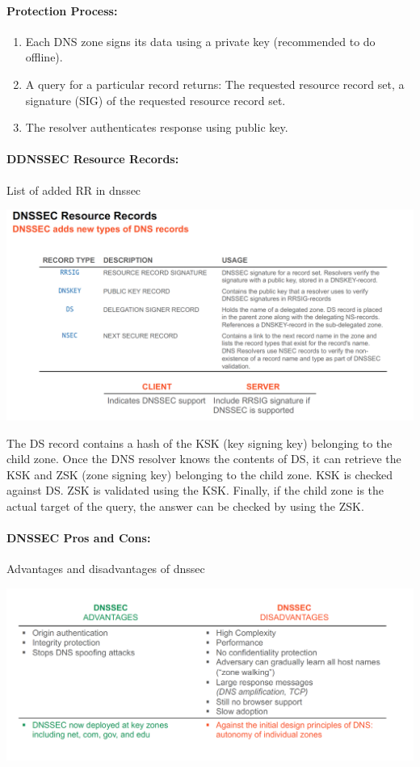 \paragraph{Protection Process:} 
\begin{enumerate}
    \item Each DNS zone signs its data using a private key (recommended to do offline).
    \item A query for a particular record returns: The requested resource record set, a signature (SIG) of the requested resource record set.
    \item The resolver authenticates response using public key.
\end{enumerate}

\paragraph{DDNSSEC Resource Records:} List of added RR in dnssec

\begin{minipage}{\linewidth}
    \centering      
    \includegraphics[width=\linewidth]{Figures/DNS_dnssec_rr.PNG} 
\end{minipage}
The DS record contains a hash of the KSK (key signing key) belonging to the
child zone. Once the DNS resolver knows the contents of DS, it can retrieve the KSK and ZSK (zone
signing key) belonging to the child zone. KSK is checked against DS. ZSK is validated using
the KSK. Finally, if the child zone is the actual target of the query, the answer
can be checked by using the ZSK.

\paragraph{DNSSEC Pros and Cons:} Advantages and disadvantages of dnssec
\begin{minipage}{\linewidth}
    \centering      
    \includegraphics[width=\linewidth]{Figures/DNS_dnssec_advantages.PNG} 
\end{minipage}

